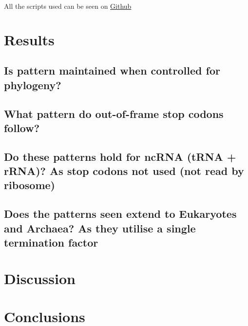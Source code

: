 \documentclass[
    emulatestandardclasses,
    parskip=half,
]{scrartcl}
\begin{document}
        All the scripts used can be seen on \href{https://github.com/TheKingOfAtlantis/BScProject}{Github}
    \section{Results}
        \subsection{Is pattern maintained when controlled for phylogeny?}
        \subsection{What pattern do out-of-frame stop codons follow?}
        \subsection{Do these patterns hold for ncRNA (tRNA + rRNA)?
                    As stop codons not used (not read by ribosome)}
        \subsection{Does the patterns seen extend to Eukaryotes and Archaea?
                    As they utilise a single termination factor}
    \section{Discussion}

    \section{Conclusions}

	\newpage {}
	\printbibliography
	\appendix\appendixpage
\end{document}
